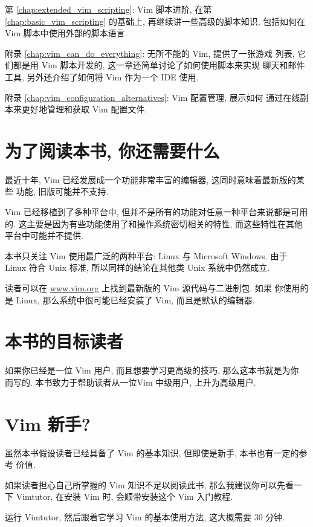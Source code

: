第 \ref{chap:extended_vim_scripting}: Vim 脚本进阶, 在第
\ref{chap:basic_vim_scripting} 的基础上, 再继续讲一些高级的脚本知识,
包括如何在 Vim 脚本中使用外部的脚本语言.

附录 \ref{chap:vim_can_do_everything}: 无所不能的 Vim, 提供了一张游戏
列表, 它们都是用 Vim 脚本开发的, 这一章还简单讨论了如何使用脚本来实现
聊天和邮件工具, 另外还介绍了如何将 Vim 作为一个 IDE 使用.

附录 \ref{chap:vim_configuration_alternatives}: Vim 配置管理, 展示如何
通过在线副本来更好地管理和获取 Vim 配置文件.

\section*{为了阅读本书, 你还需要什么}
最近十年, Vim 已经发展成一个功能非常丰富的编辑器, 这同时意味着最新版的某些
功能, 旧版可能并不支持.

Vim 已经移植到了多种平台中, 但并不是所有的功能对任意一种平台来说都是可用
的. 这主要是因为有些功能使用了和操作系统密切相关的特性, 而这些特性在其他
平台中可能并不提供.

本书只关注 Vim 使用最广泛的两种平台: Linux 与 Microsoft Windows. 由于 Linux
符合 Unix 标准, 所以同样的结论在其他类 Unix 系统中仍然成立.

\begin{warning}
读者可以在 \url{www.vim.org} 上找到最新版的 Vim 源代码与二进制包. 如果
你使用的是 Linux, 那么系统中很可能已经安装了 Vim, 而且是默认的编辑器.
\end{warning}

\section*{本书的目标读者}
\label{sec:who_this_book_is_for}
如果你已经是一位 Vim 用户, 而且想要学习更高级的技巧, 那么这本书就是为你
而写的. 本书致力于帮助读者从一位Vim 中级用户, 上升为高级用户.

\section*{Vim 新手?}
\label{sec:new_to_vim}
虽然本书假设读者已经具备了 Vim 的基本知识, 但即使是新手, 本书也有一定的参考
价值.

如果读者担心自己所掌握的 Vim  知识不足以阅读此书, 那么我建议你可以先看一下
Vimtutor, 在安装 Vim 时, 会顺带安装这个 Vim 入门教程.

运行 Vimtutor, 然后跟着它学习 Vim 的基本使用方法, 这大概需要 30 分钟.


